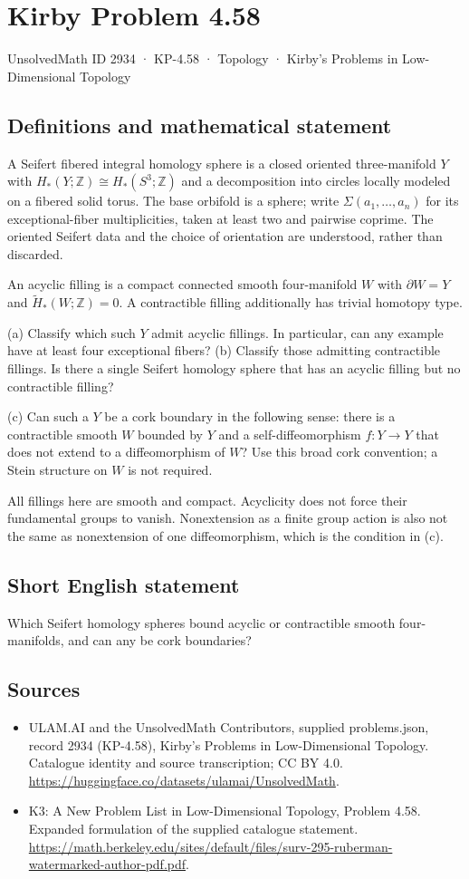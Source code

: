 \documentclass[11pt,a4paper]{article}
\begin{document}
\section*{Kirby Problem 4.58}\label{2934}
{\small UnsolvedMath ID 2934 · KP-4.58 · Topology · Kirby's Problems in Low-Dimensional Topology}
\subsection{Definitions and mathematical statement}
A Seifert fibered integral homology sphere is a closed oriented three-manifold $Y$ with $H_*(Y;\mathbb Z)\cong H_*(S^3;\mathbb Z)$ and a decomposition into circles locally modeled on a fibered solid torus. The base orbifold is a sphere; write $\Sigma(a_1,\ldots,a_n)$ for its exceptional-fiber multiplicities, taken at least two and pairwise coprime. The oriented Seifert data and the choice of orientation are understood, rather than discarded.

An acyclic filling is a compact connected smooth four-manifold $W$ with $\partial W=Y$ and $\widetilde H_*(W;\mathbb Z)=0$. A contractible filling additionally has trivial homotopy type.

(a) Classify which such $Y$ admit acyclic fillings. In particular, can any example have at least four exceptional fibers? (b) Classify those admitting contractible fillings. Is there a single Seifert homology sphere that has an acyclic filling but no contractible filling?

(c) Can such a $Y$ be a cork boundary in the following sense: there is a contractible smooth $W$ bounded by $Y$ and a self-diffeomorphism $f:Y\to Y$ that does not extend to a diffeomorphism of $W$? Use this broad cork convention; a Stein structure on $W$ is not required.

All fillings here are smooth and compact. Acyclicity does not force their fundamental groups to vanish. Nonextension as a finite group action is also not the same as nonextension of one diffeomorphism, which is the condition in (c).
\subsection{Short English statement}
Which Seifert homology spheres bound acyclic or contractible smooth four-manifolds, and can any be cork boundaries?
\subsection{Sources}
\begin{itemize}
\item[S1] ULAM.AI and the UnsolvedMath Contributors, supplied problems.json, record 2934 (KP-4.58), Kirby's Problems in Low-Dimensional Topology. Catalogue identity and source transcription; CC BY 4.0.
\url{https://huggingface.co/datasets/ulamai/UnsolvedMath}.
\item[S2] K3: A New Problem List in Low-Dimensional Topology, Problem 4.58. Expanded formulation of the supplied catalogue statement.
\url{https://math.berkeley.edu/sites/default/files/surv-295-ruberman-watermarked-author-pdf.pdf}.
\end{itemize}
\end{document}
